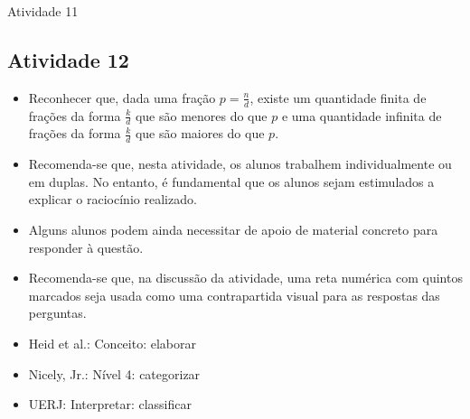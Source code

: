\begin{multicols}{2}
\begin{resposta*}{Atividade 11}
 \end{resposta*}




\subsection{Atividade 12}

\begin{itemize} %
    \item       Reconhecer que, dada uma fração       $p = \frac{n}{d}$, existe 
um quantidade finita de frações da forma       $\frac{k}{d}$       que são 
menores do que       $p$       e uma quantidade infinita de frações da forma     
  $\frac{k}{d}$       que são maiores do que       $p$.
\end{itemize} %
  
  
 
\begin{itemize} %
    \item       Recomenda-se que, nesta atividade, os alunos trabalhem 
individualmente ou em duplas. No entanto, é fundamental que os alunos sejam 
estimulados a explicar o raciocínio realizado.
    \item       Alguns alunos podem ainda necessitar de apoio de material 
concreto para responder à questão.
    \item       Recomenda-se que, na discussão da atividade, uma reta numérica 
com quintos marcados seja usada como uma contrapartida visual para as respostas 
das perguntas.
\end{itemize} %
  

\noindent {}
  
  
 \vspace{.1cm}
  
 \vspace{.1cm}
   
\begin{itemize} %
    \item       Heid et al.: Conceito: elaborar
    \item       Nicely, Jr.: Nível 4: categorizar
    \item       UERJ: Interpretar: classificar
\end{itemize} %
  


\end{multicols}
